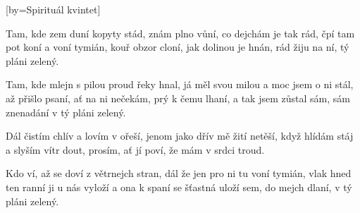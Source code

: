 [by={Spirituál kvintet}]

\beginverse{}
Tam, kde zem duní kopyty stád,
znám plno vůní, co dejchám je tak rád,
čpí tam pot koní a voní tymián,
kouř obzor cloní, jak dolinou je hnán,
rád žiju na ní, tý pláni zelený.
\endverse{}

\beginverse{}
\chordsoff{}
Tam, kde mlejn s pilou proud řeky hnal,
já měl svou milou a moc jsem o ni stál,
až přišlo psaní, ať na ni nečekám,
prý k čemu lhaní, a tak jsem zůstal sám,
sám znenadání v tý pláni zelený.
\chordson{}
\endverse{}

\beginchorus{}
Dál čistím chlív a lovím v ořeší,
jenom jako dřív mě žití netěší,
když hlídám stáj a slyším vítr dout,
prosím, ať jí poví, že mám v srdci troud.
\endchorus{}

\beginverse{}
\chordsoff{}
Kdo ví, až se doví z větrnejch stran,
dál že jen pro ni tu voní tymián,
vlak hned ten ranní ji u nás vyloží
a ona k spaní se šťastná uloží
sem, do mejch dlaní, v tý pláni zelený.
\chordson{}
\endverse{}

\endsong{}

